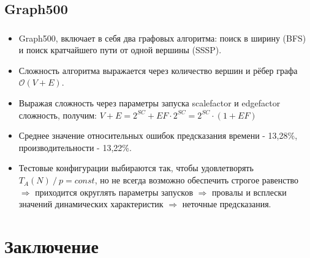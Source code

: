 \documentclass[unicode, t, 11pt]{beamer}%
\begin{document}
		\subsection{Graph500}
		\begin{frame}
			\frametitle{\insertsection}
			\framesubtitle{\insertsubsection}
			\begin{itemize}[label = \(\bullet\)]
				\item Graph500, включает в себя два графовых алгоритма: поиск в ширину (BFS) и поиск кратчайшего пути от одной вершины (SSSP).
				\item Сложность алгоритма выражается через количество вершин и рёбер графа \(\mathcal{O}(V + E)\).
				\item Выражая сложность через параметры запуска scalefactor и edgefactor сложность, получим: \(V + E = 2^{SC} + EF \cdot 2^{SC} = 2^{SC} \cdot (1 + EF) \)
				\item Среднее значение относительных ошибок предсказания времени - 13,28\%, производительности - 13,22\%.
				\item Тестовые конфигурации выбираются так, чтобы удовлетворять \(T_A(N)\:/\:p = const\), но не всегда возможно обеспечить строгое равенство \(\Rightarrow\) приходится округлять параметры запусков \(\Rightarrow\) провалы и всплески значений динамических характеристик \(\Rightarrow\) неточные предсказания.
			\end{itemize}

		\end{frame}
	\section{Заключение}
\end{document}
